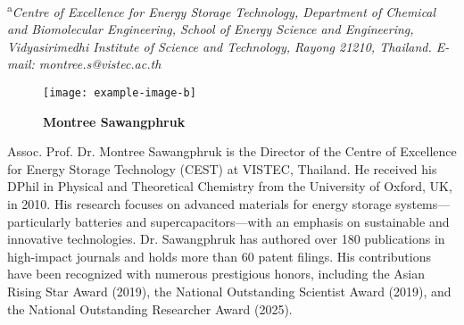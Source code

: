 \documentclass[12pt,a4paper]{article}
\begin{document}
\begin{minipage}[t]{0.48\textwidth}
    \vspace{0pt} %
    
    {\small \textsuperscript{a}\textit{Centre of Excellence for Energy Storage Technology, Department of Chemical and Biomolecular Engineering, School of Energy Science and Engineering, Vidyasirimedhi Institute of Science and Technology, Rayong 21210, Thailand. E-mail: montree.s@vistec.ac.th}}
    \vspace{1cm}
    
    \begin{wrapfigure}{l}{0.4\textwidth}
        \texttt{[image: example-image-b]} %
        \caption*{\footnotesize\textbf{Montree Sawangphruk}}
    \end{wrapfigure}

    \small
    Assoc. Prof. Dr. Montree Sawangphruk is the Director of the Centre of Excellence for Energy Storage Technology (CEST) at VISTEC, Thailand. He received his DPhil in Physical and Theoretical Chemistry from the University of Oxford, UK, in 2010. His research focuses on advanced materials for energy storage systems—particularly batteries and supercapacitors—with an emphasis on sustainable and innovative technologies. Dr. Sawangphruk has authored over 180 publications in high-impact journals and holds more than 60 patent filings. His contributions have been recognized with numerous prestigious honors, including the Asian Rising Star Award (2019), the National Outstanding Scientist Award (2019), and the National Outstanding Researcher Award (2025).
\end{minipage}
\hfill
\end{document}
